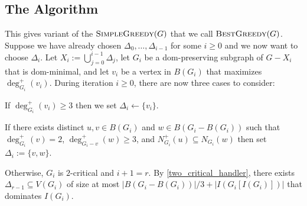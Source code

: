 \documentclass[12pt]{article}
\theoremstyle{definition}
\begin{document}
\subsection{The Algorithm}

This gives variant of the $\textsc{SimpleGreedy}(G)$ that we call $\textsc{BestGreedy}(G)$.  Suppose we have already chosen $\Delta_0,\ldots,\Delta_{i-1}$ for some $i\ge 0$ and we now want to choose $\Delta_i$.  Let $X_i:=\bigcup_{j=0}^{i-1}\Delta_j$, let $G_i$ be a dom-preserving subgraph of $G-X_i$ that is dom-minimal, and let $v_i$ be a vertex in $B(G_i)$ that maximizes $\deg^+_{G_i}(v_i)$.  During iteration $i\ge 0$, there are now three cases to consider:
\begin{compactenum}
    \item If $\deg^+_{G_i}(v_i)\ge 3$ then we set $\Delta_i\gets\{v_i\}$.
    \item If there exists distinct $u,v\in B(G_i)$ and $w\in B(G_i-B(G_i))$ such that $\deg^+_{G_i}(v)=2$, $\deg^+_{G_i-v}(w)\ge 3$, and $N^+_{G_i}(u)\subseteq N_{G_i}(w)$ then set $\Delta_i:=\{v,w\}$.
    \item Otherwise, $G_i$ is $2$-critical and $i+1=r$.  By \cref{two_critical_handler}, there exists $\Delta_{r-1}\subseteq V(G_i)$ of size at most $|B(G_i-B(G_i))|/3 + |I(G_i[I(G_i)])|$ that dominates $I(G_i)$.
\end{compactenum}
\end{document}
